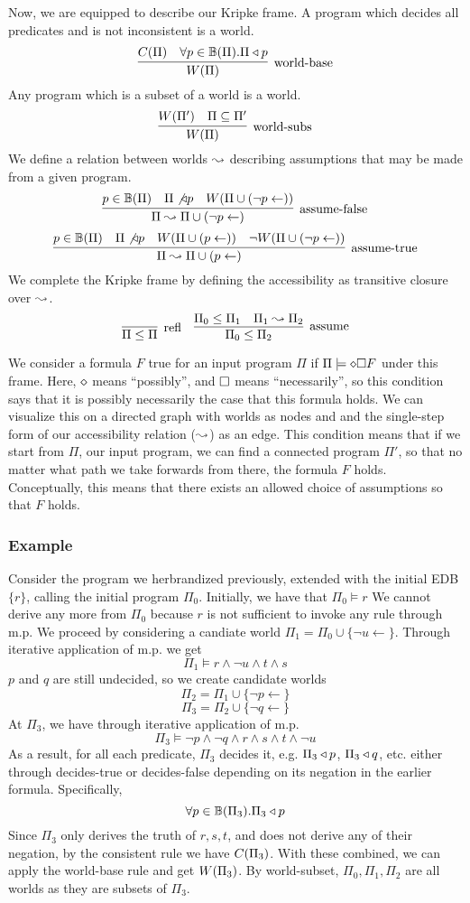 Now, we are equipped to describe our Kripke frame.
A program which decides all predicates and is not inconsistent is a world.
\[
	\infer[\textrm{world-base}]{\world{\Pi}}{\cons{\Pi} & \forall p \in \hb(\Pi). \Pi \decides p}
\]
Any program which is a subset of a world is a world.
\[
	\infer[\textrm{world-subs}]{\world{\Pi}}{\world{\Pi'} & \Pi \subseteq \Pi'}
\]
We define a relation between worlds $\leadsto$ describing assumptions that may be made from a given program.
\[
	\infer[\textrm{assume-false}]{\Pi \stepass \Pi \cup (\neg p \leftarrow)}{p \in \hb(\Pi) & \Pi \not \decides p & \world{\Pi \cup (\neg p \leftarrow)}}
\]
\[
	\infer[\textrm{assume-true}]{\Pi \stepass \Pi \cup (p \leftarrow)}{p \in \hb(\Pi) & \Pi \not \decides p & \world{\Pi \cup (p \leftarrow)} & \neg \world{\Pi \cup (\neg p \leftarrow)}}
\]
We complete the Kripke frame by defining the accessibility as transitive closure over $\leadsto$.
\[
	\infer[\textrm{refl}]{\Pi \leq \Pi}{}
	\quad
	\infer[\textrm{assume}]{\Pi_0 \leq \Pi_2}{\Pi_0 \leq \Pi_1 & \Pi_1 \stepass \Pi_2}
\]

We consider a formula $F$ true for an input program $\Pi$ if $\Pi \models \diamond \square F$ under this frame.
Here, $\diamond$ means ``possibly'', and $\square$ means ``necessarily'', so this condition says that it is possibly necessarily the case that this formula holds.
We can visualize this on a directed graph with worlds as nodes and and the single-step form of our accessibility relation ($\leadsto$) as an edge.
This condition means that if we start from $\Pi$, our input program, we can find a connected program $\Pi'$, so that no matter what path we take forwards from there, the formula $F$ holds.
Conceptually, this means that there exists an allowed choice of assumptions so that $F$ holds.

\subsubsection{Example}
Consider the program we herbrandized previously, extended with the initial EDB $\{r\}$, calling the initial program $\Pi_0$.
Initially, we have that $\Pi_0 \models r$
We cannot derive any more from $\Pi_0$ because $r$ is not sufficient to invoke any rule through m.p.
We proceed by considering a candiate world $\Pi_1 = \Pi_0 \cup \{\neg u \leftarrow\}$.
Through iterative application of m.p. we get
\[
\Pi_1 \models r \wedge \neg u \wedge t \wedge s
\]
$p$ and $q$ are still undecided, so we create candidate worlds
\[\Pi_2 = \Pi_1 \cup \{\neg p \leftarrow\}\]
\[\Pi_3 = \Pi_2 \cup \{\neg q \leftarrow\}\]
At $\Pi_3$, we have through iterative application of m.p.
\[
\Pi_3 \models \neg p \wedge \neg q \wedge r \wedge s \wedge t \wedge \neg u
\]
As a result, for all each predicate, $\Pi_3$ decides it, e.g. $\Pi_3 \triangleleft p$, $\Pi_3 \triangleleft q$, etc. either through decides-true or decides-false depending on its negation in the earlier formula.
Specifically,
\[
\forall p \in \mathbb{B}(\Pi_3). \Pi_3 \triangleleft p
\]
Since $\Pi_3$ only derives the truth of $r, s, t$, and does not derive any of their negation, by the consistent rule we have $C(\Pi_3)$.
With these combined, we can apply the world-base rule and get $W({\Pi_3})$.
By world-subset, $\Pi_0, \Pi_1, \Pi_2$ are all worlds as they are subsets of $\Pi_3$.

